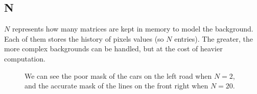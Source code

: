 \subsection*{N}
$N$ represents how many matrices are kept in memory to model the background.
Each of them stores the history of pixels values (so $N$ entries).
The greater, the more complex backgrounds can be handled, but at the cost of heavier
computation.
\begin{figure}[!t]
\centering
{}
\newline
{}
\newline
{}
\caption{We can see the poor mask of the cars on the left road when $N=2$, and the
accurate mask of the lines on the front right when $N=20$.}
\end{figure}


